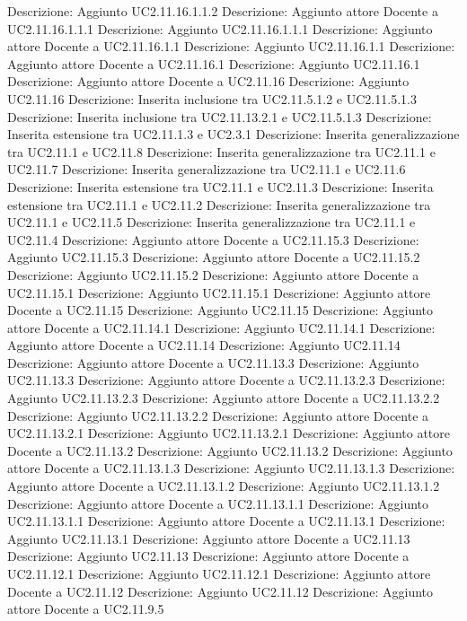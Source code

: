 Descrizione: Aggiunto UC2.11.16.1.1.2 
Descrizione: Aggiunto attore Docente a UC2.11.16.1.1.1 
Descrizione: Aggiunto UC2.11.16.1.1.1 
Descrizione: Aggiunto attore Docente a UC2.11.16.1.1 
Descrizione: Aggiunto UC2.11.16.1.1 
Descrizione: Aggiunto attore Docente a UC2.11.16.1 
Descrizione: Aggiunto UC2.11.16.1 
Descrizione: Aggiunto attore Docente a UC2.11.16 
Descrizione: Aggiunto UC2.11.16 
Descrizione: Inserita inclusione tra UC2.11.5.1.2 e UC2.11.5.1.3 
Descrizione: Inserita inclusione tra UC2.11.13.2.1 e UC2.11.5.1.3 
Descrizione: Inserita estensione tra UC2.11.1.3 e UC2.3.1 
Descrizione: Inserita generalizzazione tra UC2.11.1 e UC2.11.8 
Descrizione: Inserita generalizzazione tra UC2.11.1 e UC2.11.7 
Descrizione: Inserita generalizzazione tra UC2.11.1 e UC2.11.6 
Descrizione: Inserita estensione tra UC2.11.1 e UC2.11.3 
Descrizione: Inserita estensione tra UC2.11.1 e UC2.11.2 
Descrizione: Inserita generalizzazione tra UC2.11.1 e UC2.11.5 
Descrizione: Inserita generalizzazione tra UC2.11.1 e UC2.11.4 
Descrizione: Aggiunto attore Docente a UC2.11.15.3 
Descrizione: Aggiunto UC2.11.15.3 
Descrizione: Aggiunto attore Docente a UC2.11.15.2 
Descrizione: Aggiunto UC2.11.15.2 
Descrizione: Aggiunto attore Docente a UC2.11.15.1 
Descrizione: Aggiunto UC2.11.15.1 
Descrizione: Aggiunto attore Docente a UC2.11.15 
Descrizione: Aggiunto UC2.11.15 
Descrizione: Aggiunto attore Docente a UC2.11.14.1 
Descrizione: Aggiunto UC2.11.14.1 
Descrizione: Aggiunto attore Docente a UC2.11.14 
Descrizione: Aggiunto UC2.11.14 
Descrizione: Aggiunto attore Docente a UC2.11.13.3 
Descrizione: Aggiunto UC2.11.13.3 
Descrizione: Aggiunto attore Docente a UC2.11.13.2.3 
Descrizione: Aggiunto UC2.11.13.2.3 
Descrizione: Aggiunto attore Docente a UC2.11.13.2.2 
Descrizione: Aggiunto UC2.11.13.2.2 
Descrizione: Aggiunto attore Docente a UC2.11.13.2.1 
Descrizione: Aggiunto UC2.11.13.2.1 
Descrizione: Aggiunto attore Docente a UC2.11.13.2 
Descrizione: Aggiunto UC2.11.13.2 
Descrizione: Aggiunto attore Docente a UC2.11.13.1.3 
Descrizione: Aggiunto UC2.11.13.1.3 
Descrizione: Aggiunto attore Docente a UC2.11.13.1.2 
Descrizione: Aggiunto UC2.11.13.1.2 
Descrizione: Aggiunto attore Docente a UC2.11.13.1.1 
Descrizione: Aggiunto UC2.11.13.1.1 
Descrizione: Aggiunto attore Docente a UC2.11.13.1 
Descrizione: Aggiunto UC2.11.13.1 
Descrizione: Aggiunto attore Docente a UC2.11.13 
Descrizione: Aggiunto UC2.11.13 
Descrizione: Aggiunto attore Docente a UC2.11.12.1 
Descrizione: Aggiunto UC2.11.12.1 
Descrizione: Aggiunto attore Docente a UC2.11.12 
Descrizione: Aggiunto UC2.11.12 
Descrizione: Aggiunto attore Docente a UC2.11.9.5 

